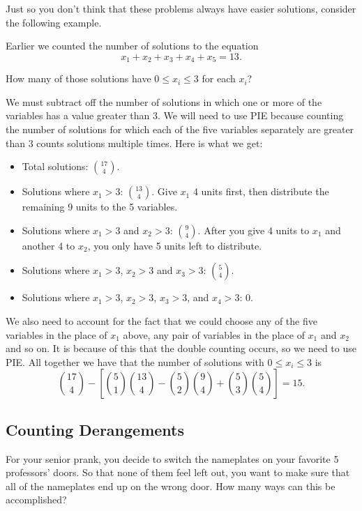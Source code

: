 \documentclass[12pt]{article}
\begin{document}
Just so you don't think that these problems always have easier solutions, consider the following example.

\begin{example}
Earlier we counted the number of solutions to the equation
\[x_1 + x_2 + x_3 + x_4 + x_5 = 13.\]

How many of those solutions have $0 \le x_i \le 3$ for each $x_i$?


\begin{solution}
 We must subtract off the number of solutions in which one or more of the variables has a value greater than 3.  We will need to use PIE because counting the number of solutions for which each of the five variables separately are greater than 3 counts solutions multiple times.  Here is what we get:
    \begin{itemize}
      \item Total solutions: ${17 \choose 4}$.
      \item Solutions where $x_1 > 3$: ${13 \choose 4}$.  Give $x_1$ 4 units first, then distribute the remaining 9 units to the 5 variables.
      \item Solutions where $x_1 > 3$ and $x_2 > 3$: ${9 \choose 4}$. After you give 4 units to $x_1$ and another 4 to $x_2$, you only have 5 units left to distribute.
      \item Solutions where $x_1 > 3$, $x_2 > 3$ and $x_3 > 3$: ${5 \choose 4}$.
      \item Solutions where $x_1 > 3$, $x_2 > 3$, $x_3 > 3$, and $x_4 > 3$: 0.
    \end{itemize}
    We also need to account for the fact that we could choose any of the five variables in the place of $x_1$ above, any pair of variables in the place of $x_1$ and $x_2$ and so on.  It is because of this that the double counting occurs, so we need to use PIE.  All together we have that the number of solutions with $0 \le x_i \le 3$ is
    \[{17 \choose 4} - \left[{5\choose 1}{13 \choose 4} - {5 \choose 2}{9 \choose 4} + {5 \choose 3}{5 \choose 4}\right] = 15.\]
  \end{solution}
\end{example}




\newpage
\subsection{Counting Derangements}\label{subsec:derangements}

\begin{activity}
For your senior prank, you decide to switch the nameplates on your favorite 5 professors' doors.  So that none of them feel left out, you want to make sure that all of the nameplates end up on the wrong door.  How many ways can this be accomplished?
\end{activity}
\end{document}
